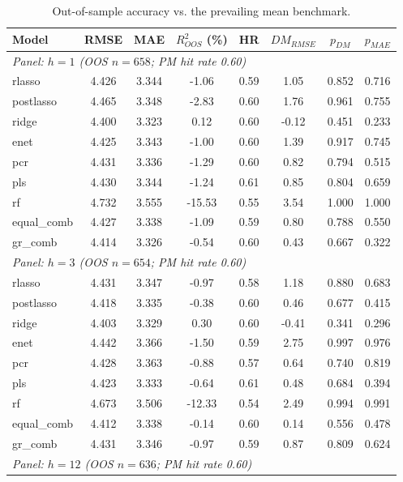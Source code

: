 \begin{table}[H]
\centering
\caption{Out-of-sample accuracy vs. the prevailing mean benchmark.}
\label{tab:table2}
\normalsize
\begin{threeparttable}
\begin{tabular}{lccccccc}
\toprule
Model & RMSE & MAE & $R^2_{OOS}$ (\%) & HR & $DM_{RMSE}$ & $p_{DM}$ & $p_{MAE}$ \\
\midrule
\multicolumn{8}{l}{\emph{Panel: $h=1$ (OOS $n=658$; PM hit rate 0.60)}} \\
rlasso & 4.426 & 3.344 & -1.06 & 0.59 & 1.05 & 0.852 & 0.716 \\
postlasso & 4.465 & 3.348 & -2.83 & 0.60 & 1.76 & 0.961 & 0.755 \\
ridge & 4.400 & 3.323 & 0.12 & 0.60 & -0.12 & 0.451 & 0.233 \\
enet & 4.425 & 3.343 & -1.00 & 0.60 & 1.39 & 0.917 & 0.745 \\
pcr & 4.431 & 3.336 & -1.29 & 0.60 & 0.82 & 0.794 & 0.515 \\
pls & 4.430 & 3.344 & -1.24 & 0.61 & 0.85 & 0.804 & 0.659 \\
rf & 4.732 & 3.555 & -15.53 & 0.55 & 3.54 & 1.000 & 1.000 \\
equal\_comb & 4.427 & 3.338 & -1.09 & 0.59 & 0.80 & 0.788 & 0.550 \\
gr\_comb & 4.414 & 3.326 & -0.54 & 0.60 & 0.43 & 0.667 & 0.322 \\
\multicolumn{8}{l}{\emph{Panel: $h=3$ (OOS $n=654$; PM hit rate 0.60)}} \\
rlasso & 4.431 & 3.347 & -0.97 & 0.58 & 1.18 & 0.880 & 0.683 \\
postlasso & 4.418 & 3.335 & -0.38 & 0.60 & 0.46 & 0.677 & 0.415 \\
ridge & 4.403 & 3.329 & 0.30 & 0.60 & -0.41 & 0.341 & 0.296 \\
enet & 4.442 & 3.366 & -1.50 & 0.59 & 2.75 & 0.997 & 0.976 \\
pcr & 4.428 & 3.363 & -0.88 & 0.57 & 0.64 & 0.740 & 0.819 \\
pls & 4.423 & 3.333 & -0.64 & 0.61 & 0.48 & 0.684 & 0.394 \\
rf & 4.673 & 3.506 & -12.33 & 0.54 & 2.49 & 0.994 & 0.991 \\
equal\_comb & 4.412 & 3.338 & -0.14 & 0.60 & 0.14 & 0.556 & 0.478 \\
gr\_comb & 4.431 & 3.346 & -0.97 & 0.59 & 0.87 & 0.809 & 0.624 \\
\multicolumn{8}{l}{\emph{Panel: $h=12$ (OOS $n=636$; PM hit rate 0.60)}} \\

\end{tabular}
\end{threeparttable}
\end{table}
